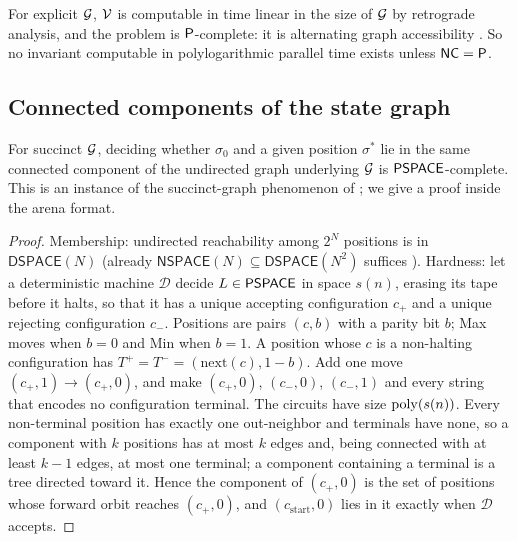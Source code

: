 \begin{proposition}\label{prop:explicit}
For explicit $\mathcal{G}$, $\mathcal{V}$ is computable in time linear in the size of $\mathcal{G}$ by retrograde analysis, and the problem is $\mathsf{P}$-complete: it is alternating graph accessibility \cite{Immerman,GHR}. So no invariant computable in polylogarithmic parallel time exists unless $\mathsf{NC}=\mathsf{P}$.
\end{proposition}

\subsection{Connected components of the state graph}

\begin{proposition}\label{prop:components}
For succinct $\mathcal{G}$, deciding whether $\sigma_0$ and a given position $\sigma^{*}$ lie in the same connected component of the undirected graph underlying $\mathcal{G}$ is $\mathsf{PSPACE}$-complete. This is an instance of the succinct-graph phenomenon of \cite{GalperinWigderson,PapadimitriouYannakakis,LozanoBalcazar}; we give a proof inside the arena format.
\end{proposition}

\begin{proof}
Membership: undirected reachability among $2^N$ positions is in $\mathsf{DSPACE}(N)$ \cite{Reingold} (already $\mathsf{NSPACE}(N)\subseteq\mathsf{DSPACE}(N^2)$ suffices \cite{Savitch}). Hardness: let a deterministic machine $\mathcal D$ decide $L\in\mathsf{PSPACE}$ in space $s(n)$, erasing its tape before it halts, so that it has a unique accepting configuration $c_{+}$ and a unique rejecting configuration $c_{-}$. Positions are pairs $(c,b)$ with a parity bit $b$; Max moves when $b=0$ and Min when $b=1$. A position whose $c$ is a non-halting configuration has $T^{+}=T^{-}=(\mathrm{next}(c),1-b)$. Add one move $(c_{+},1)\to(c_{+},0)$, and make $(c_{+},0)$, $(c_{-},0)$, $(c_{-},1)$ and every string that encodes no configuration terminal. The circuits have size $\operatorname{poly}(s(n))$. Every non-terminal position has exactly one out-neighbor and terminals have none, so a component with $k$ positions has at most $k$ edges and, being connected with at least $k-1$ edges, at most one terminal; a component containing a terminal is a tree directed toward it. Hence the component of $(c_{+},0)$ is the set of positions whose forward orbit reaches $(c_{+},0)$, and $(c_{\mathrm{start}},0)$ lies in it exactly when $\mathcal D$ accepts.
\end{proof}

